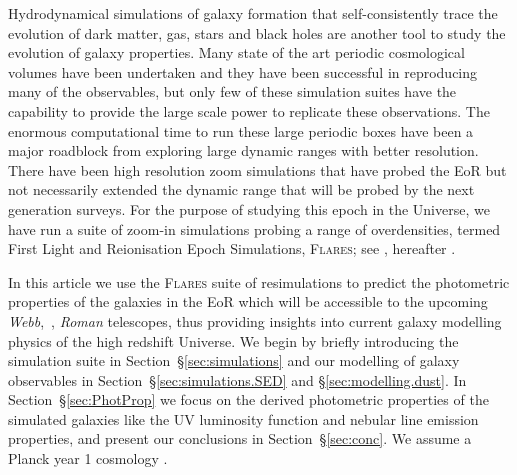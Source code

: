 Hydrodynamical simulations of galaxy formation that self-consistently trace the evolution of dark matter, gas, stars and black holes are another tool to study the evolution of galaxy properties. 
Many state of the art periodic cosmological volumes \citep[\eg][]{vogelsberger_introducing_2014,Dubois2014,Khandai2015,schaye_eagle_2015,Feng2016,dave_mufasa:_2016-1,Pillepich2018,dave_simba:_2019} have been undertaken and they have been successful in reproducing many of the observables, but only few of these simulation suites have the capability to provide the large scale power to replicate these observations. The enormous computational time to run these large periodic boxes have been a major roadblock from exploring large dynamic ranges with better resolution. There have been high resolution zoom simulations that have probed the EoR \citep[\eg][]{Ceverino2017,Ma2018} but not necessarily extended the dynamic range that will be probed by the next generation surveys. For the purpose of studying this epoch in the Universe, we have run a suite of zoom-in simulations probing a range of overdensities, termed First Light and Reionisation Epoch Simulations, \textsc{Flares}; see \cite{lovell2020}, hereafter . 

In this article we use the \textsc{Flares} suite of resimulations to predict the photometric properties of the galaxies in the EoR which will be accessible to the upcoming \textit{Webb}, \euclid\,,  \textit{Roman} telescopes, thus providing insights into current galaxy modelling physics of the high redshift Universe. We begin by briefly introducing the simulation suite in Section~\S\ref{sec:simulations} and our modelling of galaxy observables in Section~\S\ref{sec:simulations.SED} and \S\ref{sec:modelling.dust}. In Section~\S\ref{sec:PhotProp} we focus on the derived photometric properties of the simulated galaxies like the UV luminosity function and nebular line emission properties, and present our conclusions in Section~\S\ref{sec:conc}. We assume a Planck year 1 cosmology \citep[$\Omega_{m}$ = 0.307, $\Omega_{\Lambda}$ = 0.693, h = 0.6777;][]{planck_collaboration_2014}. 
